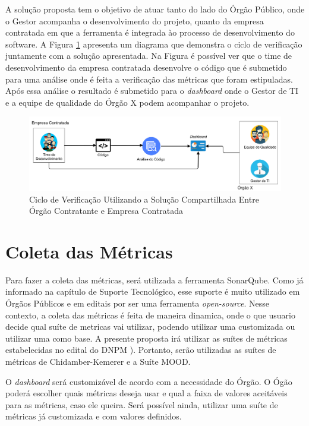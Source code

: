 A solução proposta tem o objetivo de atuar tanto do lado do Órgão Público, onde o Gestor acompanha o desenvolvimento do projeto, quanto da empresa contratada em que a ferramenta é integrada ào processo de desenvolvimento do software. A Figura \ref{img:ciclo_ver} apresenta um diagrama que demonstra o ciclo de verificação juntamente com a solução apresentada. Na Figura é possível ver que o time de desenvolvimento da empresa contratada desenvolve o código que é submetido para uma análise onde é feita a verificação das métricas que foram estipuladas. Após essa análise o resultado é submetido para o \textit{dashboard} onde o Gestor de TI e a equipe de qualidade do Órgão X podem acompanhar o projeto.

\graphicspath{{figuras/}}
\begin{figure}[h!]
\centering
\includegraphics[scale=0.30]{proc_ver.png}
\caption{Ciclo de Verificação Utilizando a Solução Compartilhada Entre Órgão Contratante e Empresa Contratada}
\label{img:ciclo_ver}
\end{figure}


\section{Coleta das Métricas}
Para fazer a coleta das métricas, será utilizada a ferramenta SonarQube. Como já informado na capítulo de Suporte Tecnológico, esse suporte é muito utilizado em Órgãos Públicos e em editais por ser uma ferramenta \textit{open-source}. Nesse contexto, a coleta das métricas é feita de maneira dinamica, onde o que usuario decide qual suíte de metricas vai utilizar, podendo utilizar uma customizada ou utilizar uma como base. A presente proposta irá utilizar as suítes de métricas estabelecidas no edital do DNPM \cite{edital}). Portanto, serão utilizadas as suítes de métricas de Chidamber-Kemerer e a Suíte MOOD.

O \textit{dashboard} será customizável de acordo com a necessidade do Órgão. O Ógão poderá escolher quais métricas deseja usar e qual a faixa de valores aceitáveis para as métricas, caso ele queira. Será possível ainda, utilizar uma suíte de métricas já customizada e com valores definidos. 

